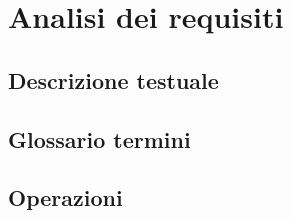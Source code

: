 \section{Analisi dei requisiti}
\subsection{Descrizione testuale}
\subsection{Glossario termini}
\subsection{Operazioni}